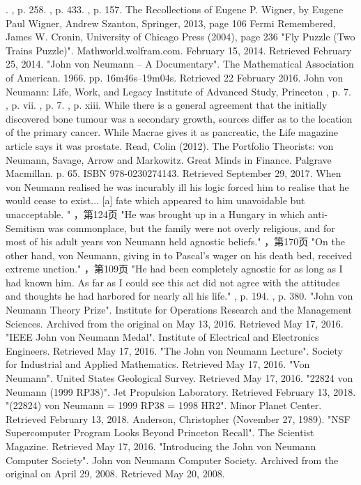 \begin{enumerate}
.
, p. 258.
, p. 433.
, p. 157.
The Recollections of Eugene P. Wigner, by Eugene Paul Wigner, Andrew Szanton, Springer, 2013, page 106
Fermi Remembered, James W. Cronin, University of Chicago Press (2004), page 236
"Fly Puzzle (Two Trains Puzzle)". Mathworld.wolfram.com. February 15, 2014. Retrieved February 25, 2014.
"John von Neumann – A Documentary". The Mathematical Association of American. 1966. pp. 16m46s–19m04s. Retrieved 22 February 2016.
John von Neumann: Life, Work, and Legacy Institute of Advanced Study, Princeton
, p. 7.
, p. vii.
, p. 7.
, p. xiii.
While there is a general agreement that the initially discovered bone tumour was a secondary growth, sources differ as to the location of the primary cancer. While Macrae gives it as pancreatic, the Life magazine article says it was prostate.
Read, Colin (2012). The Portfolio Theorists: von Neumann, Savage, Arrow and Markowitz. Great Minds in Finance. Palgrave Macmillan. p. 65. ISBN 978-0230274143. Retrieved September 29, 2017. When von Neumann realised he was incurably ill his logic forced him to realise that he would cease to exist... [a] fate which appeared to him unavoidable but unacceptable.
"
，第124页 "He was brought up in a Hungary in which anti-Semitism was commonplace, but the family were not overly religious, and for most of his adult years von Neumann held agnostic beliefs."
，第170页 "On the other hand, von Neumann, giving in to Pascal's wager on his death bed, received extreme unction."
，第109页 "He had been completely agnostic for as long as I had known him. As far as I could see this act did not agree with the attitudes and thoughts he had harbored for nearly all his life."
, p. 194.
, p. 380.
"John von Neumann Theory Prize". Institute for Operations Research and the Management Sciences. Archived from the original on May 13, 2016. Retrieved May 17, 2016.
"IEEE John von Neumann Medal". Institute of Electrical and Electronics Engineers. Retrieved May 17, 2016.
"The John von Neumann Lecture". Society for Industrial and Applied Mathematics. Retrieved May 17, 2016.
"Von Neumann". United States Geological Survey. Retrieved May 17, 2016.
"22824 von Neumann (1999 RP38)". Jet Propulsion Laboratory. Retrieved February 13, 2018.
"(22824) von Neumann = 1999 RP38 = 1998 HR2". Minor Planet Center. Retrieved February 13, 2018.
Anderson, Christopher (November 27, 1989). "NSF Supercomputer Program Looks Beyond Princeton Recall". The Scientist Magazine. Retrieved May 17, 2016.
"Introducing the John von Neumann Computer Society". John von Neumann Computer Society. Archived from the original on April 29, 2008. Retrieved May 20, 2008.

\end{enumerate}
